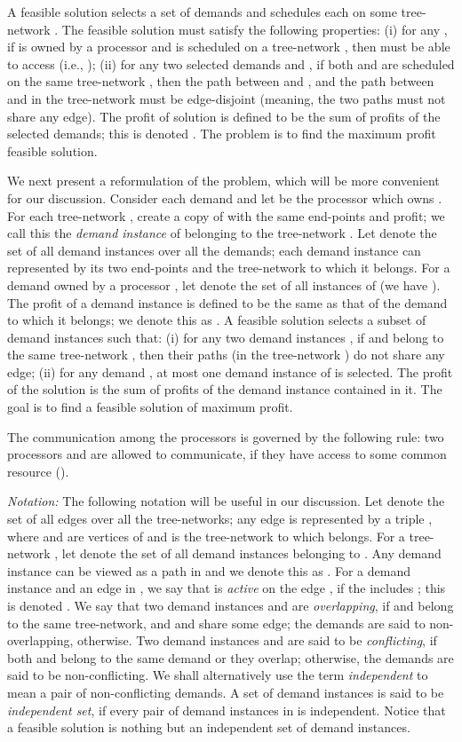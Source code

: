 \documentclass[11pt]{article}
\begin{document}
A feasible solution  selects a set of demands 
and schedules each  on some tree-network .
The feasible solution must satisfy the following properties:
(i) for any , if  is owned by a processor 
and  is scheduled on a tree-network , then  must be able to access  (i.e., );
(ii) for any two selected demands  and ,
if both  and  are scheduled on the same tree-network ,
then the path between  and , and the path between  and  in the
tree-network  must be edge-disjoint (meaning, the two paths must not share any edge).
The profit of solution  is defined to be the sum of profits of the selected demands;
this is denoted . The problem is to find the maximum profit feasible solution.

We next present a reformulation of the problem, which will be more convenient for our discussion.
Consider each demand  and let  be the processor which owns .
For each tree-network , create a copy of  with the same end-points and profit; 
we call this the {\em demand instance} of  belonging to the tree-network .
Let  denote the set of all demand instances over all the demands;
each demand instance  can represented by its two end-points and the tree-network to which it belongs.
For a demand  owned by a processor , 
let  denote the set of all instances of  (we have ). 
The profit of a demand instance  is defined to be the same
as that of the demand to which it belongs; we denote this as .
A feasible solution selects a subset of demand instances 
such that: 
(i) for any two demand instances , if  and  belong to the same tree-network ,
then their paths (in the tree-network ) do not share any edge;
(ii) for any demand , at most one demand instance of  is selected.
The profit of the solution is the sum of profits of the demand instance contained in it.
The goal is to find a feasible solution of maximum profit.

The communication among the processors is governed by the following rule:
two processors  and  are allowed to communicate, if
they have access to some common resource ().

{\it Notation: }The following notation will be useful in our discussion.
Let  denote the set of all edges over all the tree-networks;
any edge  is represented by a triple ,
where  and  are vertices of  and  is the tree-network to which  belongs.
For a tree-network , let  denote the set of all demand instances belonging to .
Any demand instance  can be viewed as a path in  and we denote this as .
For a demand instance  and an edge  in ,
we say that  is {\em active} on the edge , if the  includes ;
this is denoted . We say that two demand instances  and  are
{\em overlapping}, if  and  belong to the same tree-network, 
and  and  share some edge;
the demands are said to non-overlapping, otherwise.
Two demand instances  and  are said to be {\em conflicting}, 
if both  and  belong to the same demand or they overlap;
otherwise, the demands are said to be non-conflicting.
We shall alternatively use the term {\em independent} to mean a pair of non-conflicting demands.
A set of demand instances  is said to be {\em independent set},
if every pair of demand instances in  is independent.
Notice that a feasible solution is nothing but an independent set of demand instances.
\end{document}
